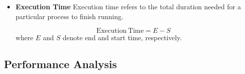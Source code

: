 \documentclass[a4paper,fleqn]{cas-sc}
\begin{document}
\begin{itemize}
\begin{equation}
\mathrm{F1\text{-}Score} = \frac{2 \times TP}{2 \times TP + FP + FN}
\end{equation}

\item \textbf{Execution Time}
Execution time refers to the total duration needed for a particular process to finish running.

\begin{equation}
\mathrm{Execution\ Time} = E - S
\end{equation}
where $E$ and $S$ denote end and start time, respectively.

\end{itemize}



\subsection{Performance Analysis}\label{subsec:perf}
\end{document}
